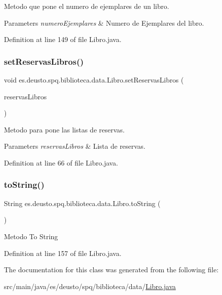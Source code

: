 Metodo que pone el numero de ejemplares de un libro. 
\begin{DoxyParams}{Parameters}
{\em numero\+Ejemplares} & Numero de Ejemplares del libro. \\
\hline
\end{DoxyParams}


Definition at line 149 of file Libro.\+java.

\mbox{\label{classes_1_1deusto_1_1spq_1_1biblioteca_1_1data_1_1_libro_aaee59e81f8e43abc1088ac306b812d89}} 
\subsubsection{\texorpdfstring{set\+Reservas\+Libros()}{setReservasLibros()}}
{\footnotesize\ttfamily void es.\+deusto.\+spq.\+biblioteca.\+data.\+Libro.\+set\+Reservas\+Libros (\begin{DoxyParamCaption}\item[{List$<$ \mbox{\hyperlink{classes_1_1deusto_1_1spq_1_1biblioteca_1_1data_1_1_reserva_libro}{Reserva\+Libro}} $>$}]{reservas\+Libros }\end{DoxyParamCaption})}

Metodo para pone las listas de reservas. 
\begin{DoxyParams}{Parameters}
{\em reservas\+Libros} & Lista de reservas. \\
\hline
\end{DoxyParams}


Definition at line 66 of file Libro.\+java.

\mbox{\label{classes_1_1deusto_1_1spq_1_1biblioteca_1_1data_1_1_libro_ac4ade112ff225403986255f1809221a7}} 
\subsubsection{\texorpdfstring{to\+String()}{toString()}}
{\footnotesize\ttfamily String es.\+deusto.\+spq.\+biblioteca.\+data.\+Libro.\+to\+String (\begin{DoxyParamCaption}{ }\end{DoxyParamCaption})}

Metodo To String 

Definition at line 157 of file Libro.\+java.



The documentation for this class was generated from the following file\+:\begin{DoxyCompactItemize}
\item 
src/main/java/es/deusto/spq/biblioteca/data/\mbox{\hyperlink{_libro_8java}{Libro.\+java}}\end{DoxyCompactItemize}
